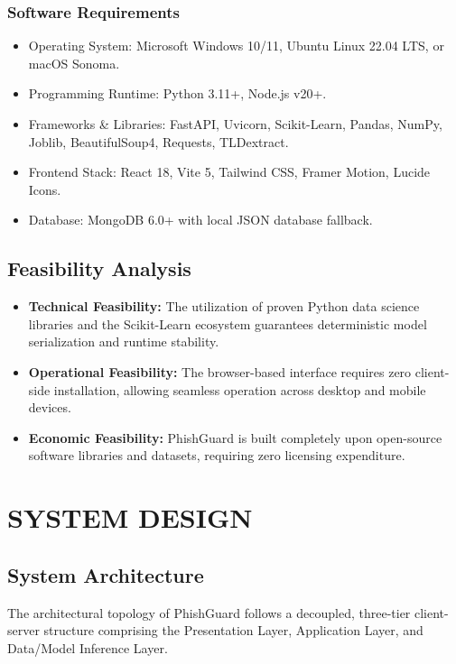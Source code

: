 \documentclass[BTech]{srmuthesis}
\begin{document}
\subsection{Software Requirements}
\begin{itemize}
    \item Operating System: Microsoft Windows 10/11, Ubuntu Linux 22.04 LTS, or macOS Sonoma.
    \item Programming Runtime: Python 3.11+, Node.js v20+.
    \item Frameworks \& Libraries: FastAPI, Uvicorn, Scikit-Learn, Pandas, NumPy, Joblib, BeautifulSoup4, Requests, TLDextract.
    \item Frontend Stack: React 18, Vite 5, Tailwind CSS, Framer Motion, Lucide Icons.
    \item Database: MongoDB 6.0+ with local JSON database fallback.
\end{itemize}

\section{Feasibility Analysis}
\begin{itemize}
    \item \textbf{Technical Feasibility:} The utilization of proven Python data science libraries and the Scikit-Learn ecosystem guarantees deterministic model serialization and runtime stability.
    \item \textbf{Operational Feasibility:} The browser-based interface requires zero client-side installation, allowing seamless operation across desktop and mobile devices.
    \item \textbf{Economic Feasibility:} PhishGuard is built completely upon open-source software libraries and datasets, requiring zero licensing expenditure.
\end{itemize}

\chapter{SYSTEM DESIGN}
\label{chap:design}

\section{System Architecture}
The architectural topology of PhishGuard follows a decoupled, three-tier client-server structure comprising the Presentation Layer, Application Layer, and Data/Model Inference Layer.
\end{document}
